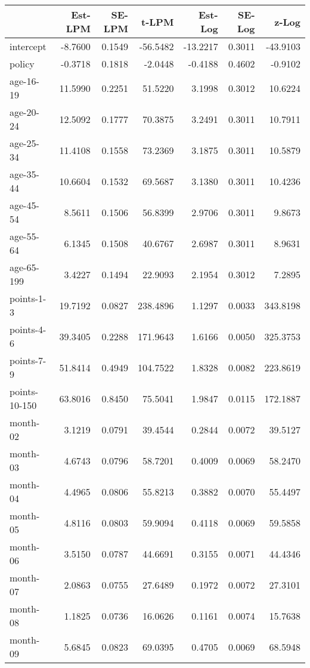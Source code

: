 \documentclass[10pt]{article}
\begin{document}
\begin{table}[ht]
\centering
\begin{tabular}{lrrrrrr}
  \hline
 & Est-LPM & SE-LPM & t-LPM & Est-Log & SE-Log & z-Log \\ 
  \hline
intercept & -8.7600 & 0.1549 & -56.5482 & -13.2217 & 0.3011 & -43.9103 \\ 
  policy & -0.3718 & 0.1818 & -2.0448 & -0.4188 & 0.4602 & -0.9102 \\ 
  age-16-19 & 11.5990 & 0.2251 & 51.5220 & 3.1998 & 0.3012 & 10.6224 \\ 
  age-20-24 & 12.5092 & 0.1777 & 70.3875 & 3.2491 & 0.3011 & 10.7911 \\ 
  age-25-34 & 11.4108 & 0.1558 & 73.2369 & 3.1875 & 0.3011 & 10.5879 \\ 
  age-35-44 & 10.6604 & 0.1532 & 69.5687 & 3.1380 & 0.3011 & 10.4236 \\ 
  age-45-54 & 8.5611 & 0.1506 & 56.8399 & 2.9706 & 0.3011 & 9.8673 \\ 
  age-55-64 & 6.1345 & 0.1508 & 40.6767 & 2.6987 & 0.3011 & 8.9631 \\ 
  age-65-199 & 3.4227 & 0.1494 & 22.9093 & 2.1954 & 0.3012 & 7.2895 \\ 
  points-1-3 & 19.7192 & 0.0827 & 238.4896 & 1.1297 & 0.0033 & 343.8198 \\ 
  points-4-6 & 39.3405 & 0.2288 & 171.9643 & 1.6166 & 0.0050 & 325.3753 \\ 
  points-7-9 & 51.8414 & 0.4949 & 104.7522 & 1.8328 & 0.0082 & 223.8619 \\ 
  points-10-150 & 63.8016 & 0.8450 & 75.5041 & 1.9847 & 0.0115 & 172.1887 \\ 
  month-02 & 3.1219 & 0.0791 & 39.4544 & 0.2844 & 0.0072 & 39.5127 \\ 
  month-03 & 4.6743 & 0.0796 & 58.7201 & 0.4009 & 0.0069 & 58.2470 \\ 
  month-04 & 4.4965 & 0.0806 & 55.8213 & 0.3882 & 0.0070 & 55.4497 \\ 
  month-05 & 4.8116 & 0.0803 & 59.9094 & 0.4118 & 0.0069 & 59.5858 \\ 
  month-06 & 3.5150 & 0.0787 & 44.6691 & 0.3155 & 0.0071 & 44.4346 \\ 
  month-07 & 2.0863 & 0.0755 & 27.6489 & 0.1972 & 0.0072 & 27.3101 \\ 
  month-08 & 1.1825 & 0.0736 & 16.0626 & 0.1161 & 0.0074 & 15.7638 \\ 
  month-09 & 5.6845 & 0.0823 & 69.0395 & 0.4705 & 0.0069 & 68.5948 \\ 

\end{tabular}
\end{table}
\end{document}
